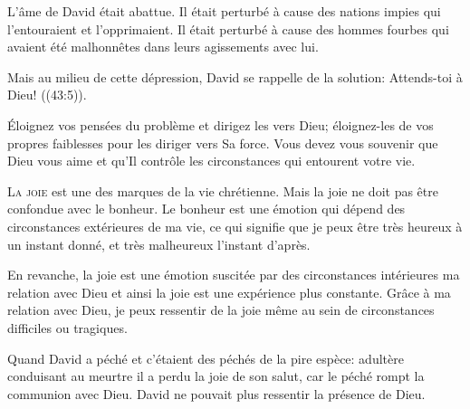 L'âme de David était abattue. Il était perturbé à cause des nations impies
 qui l'entouraient et l'opprimaient.
 Il était perturbé à cause des hommes fourbes qui avaient été malhonnêtes
 dans leurs agissements avec lui. 

Mais au milieu de cette dépression, David se rappelle de la solution:
 \Og Attends-toi à Dieu! \Fg{} ((43:5)).



Éloignez vos pensées du problème et dirigez les vers Dieu;
 éloignez-les de vos propres faiblesses pour les diriger vers Sa force.
 Vous devez vous souvenir que Dieu vous aime et qu'Il contrôle
 les circonstances qui entourent votre vie. 

\dvrule






\lettrine{L}{a joie} est une des marques de la vie chrétienne.
 Mais la joie ne doit pas être confondue avec le bonheur.
 Le bonheur est une émotion qui dépend des circonstances
 extérieures de ma vie, ce qui signifie que je peux être très heureux
 à un instant donné, et très malheureux l'instant d'après. 

En revanche, la joie est une émotion suscitée par des circonstances
 intérieures \ocadr ma relation avec Dieu \fcadr{} et ainsi la joie
 est une expérience plus constante.
 Grâce à ma relation avec Dieu, je peux ressentir de la joie
 même au sein de circonstances difficiles ou tragiques. 

Quand David a péché \ocadr et c'étaient des péchés de la pire espèce:
 adultère conduisant au meurtre \fcadr{} il a perdu la joie de son salut,
 car le péché rompt la communion avec Dieu.
 David ne pouvait plus ressentir la présence de Dieu. 


